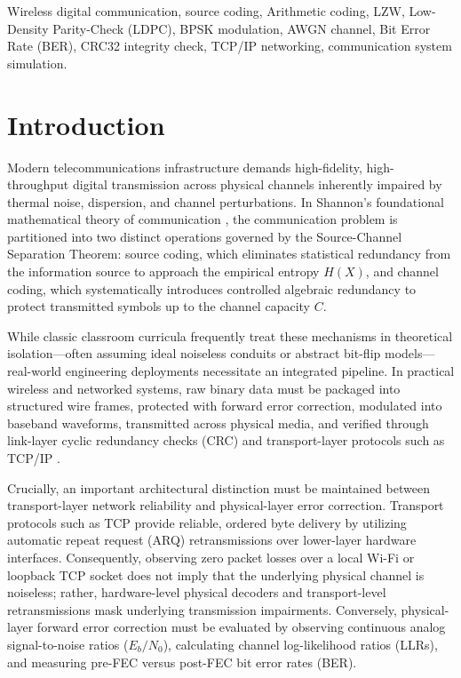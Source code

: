 \documentclass[conference]{IEEEtran}
\begin{document}
\begin{IEEEkeywords}
Wireless digital communication, source coding, Arithmetic coding, LZW, Low-Density Parity-Check (LDPC), BPSK modulation, AWGN channel, Bit Error Rate (BER), CRC32 integrity check, TCP/IP networking, communication system simulation.
\end{IEEEkeywords}

\section{Introduction}
Modern telecommunications infrastructure demands high-fidelity, high-throughput digital transmission across physical channels inherently impaired by thermal noise, dispersion, and channel perturbations. In Shannon's foundational mathematical theory of communication \cite{shannon1948}, the communication problem is partitioned into two distinct operations governed by the Source-Channel Separation Theorem: source coding, which eliminates statistical redundancy from the information source to approach the empirical entropy $H(X)$, and channel coding, which systematically introduces controlled algebraic redundancy to protect transmitted symbols up to the channel capacity $C$.

While classic classroom curricula frequently treat these mechanisms in theoretical isolation—often assuming ideal noiseless conduits or abstract bit-flip models—real-world engineering deployments necessitate an integrated pipeline. In practical wireless and networked systems, raw binary data must be packaged into structured wire frames, protected with forward error correction, modulated into baseband waveforms, transmitted across physical media, and verified through link-layer cyclic redundancy checks (CRC) and transport-layer protocols such as TCP/IP \cite{postel1981rfc793}.

Crucially, an important architectural distinction must be maintained between transport-layer network reliability and physical-layer error correction. Transport protocols such as TCP provide reliable, ordered byte delivery by utilizing automatic repeat request (ARQ) retransmissions over lower-layer hardware interfaces. Consequently, observing zero packet losses over a local Wi-Fi or loopback TCP socket does not imply that the underlying physical channel is noiseless; rather, hardware-level physical decoders and transport-level retransmissions mask underlying transmission impairments. Conversely, physical-layer forward error correction must be evaluated by observing continuous analog signal-to-noise ratios ($E_b/N_0$), calculating channel log-likelihood ratios (LLRs), and measuring pre-FEC versus post-FEC bit error rates (BER).
\end{document}

